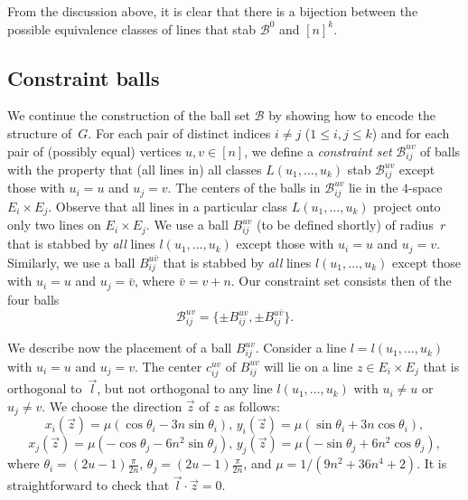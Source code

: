 \documentclass[12pt]{article}
\begin{document}
From the discussion above, it is clear that there is a bijection between the possible equivalence classes of lines that 
stab $\mathcal{B}^0$ and $[n]^k$. 
\subsection{Constraint balls}

We continue the construction of the ball set $\mathcal{B}$ by showing how
to encode the structure of~$G$.  For each pair of distinct indices $i\neq
j$ ($1\leq i,j \leq k$) and for each pair of (possibly equal) vertices
$u,v\in[n]$, we define a \emph{constraint set} $\mathcal{B}_{ij}^{uv}$ of balls
with the property that (all lines in) all classes $L(u_1,\ldots,u_k)$ stab
$\mathcal{B}_{ij}^{uv}$ except those with $u_i=u$ and $u_j=v$. The centers
of the balls in $\mathcal{B}_{ij}^{uv}$ lie in the $4$-space $E_i\times
E_j$. Observe that all lines in a particular class $L(u_1,\ldots,u_k)$ project onto
only two lines on $E_i\times E_j$.
We use a ball $B_{ij}^{uv}$ (to be defined shortly) of radius~$r$ that is stabbed by \emph{all} lines $l(u_1,\ldots,u_k)$ except those 
with $u_i=u$ and $u_j=v$.
Similarly, we use a ball $B_{ij}^{u\bar v}$ that is stabbed by \emph{all} lines $l(u_1,\ldots,u_k)$ except those 
with $u_i=u$ and $u_j=\bar v$, where $\bar v=v+n$. 
Our constraint set consists then of the four balls
$$\mathcal{B}_{ij}^{uv}=\{\pm B_{ij}^{uv}, \pm B_{ij}^{u\bar v}\}.$$


We describe now the placement of a ball $B_{ij}^{uv}$. Consider a line $l=l(u_1,\ldots,u_k)$ with 
$u_i=u$ and $u_j=v$. The center $c_{ij}^{uv}$ of $B_{ij}^{uv}$ will lie on a line ${z}\in E_i\times E_j$ that is
orthogonal to~$\vec{l}$, but not orthogonal to any line $l(u_1,\ldots,u_k)$ with 
$u_i\neq u$ or $u_j\neq v$. We choose the direction
$\vec{z}$ of $z$ as follows: 
$$x_i(\vec{z})=\mu(\cos\theta_i-3n\sin\theta_i),\, 
y_i(\vec{z})=\mu(\sin\theta_i+3n\cos\theta_i),$$ 
$$x_j(\vec{z})=\mu(-\cos\theta_j-6n^2\sin\theta_j),\, 
y_j(\vec{z})=\mu(-\sin\theta_j+6n^2\cos\theta_j),$$
where $\theta_i=(2u-1)\frac{\pi}{2n}$, $\theta_j=(2u-1)\frac{\pi}{2n}$, and $\mu=1/(9n^2+36n^4+2)$. 
It is straightforward to check that $\vec{l}\cdot\vec{z}=0$.
\end{document}
